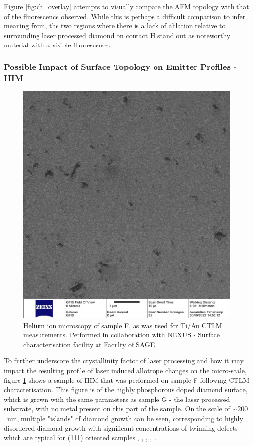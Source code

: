 \begin{refsection}
Figure \ref{fig:ch_overlay} attempts to visually compare the AFM topology with that of the fluorescence observed. While this is perhaps a difficult comparison to infer meaning from, the two regions where there is a lack of ablation relative to surrounding laser processed diamond on contact H stand out as noteworthy material with a visible fluorescence.

\subsubsection{Possible Impact of Surface Topology on Emitter Profiles - HIM}

\begin{figure}[H]
    \centering
    \includegraphics[width=\linewidth]{Chapter7/Figs/Raster/him 002 A.1.jpg}
    \caption{Helium ion microscopy of sample F, as was used for Ti/Au CTLM measurements. Performed in collaboration with NEXUS - Surface characterisation facility at Faculty of SAGE.}
    \label{fig:him_1}
\end{figure}

To further underscore the crystallinity factor of laser processing and how it may impact the resulting profile of laser induced allotrope changes on the micro-scale, figure \ref{fig:him_1} shows a sample of HIM that was performed on sample F following CTLM characterisation. This figure is of the highly phosphorous doped diamond surface, which is grown with the same parameters as sample G - the laser processed substrate, with no metal present on this part of the sample. On the scale of $\sim200$~\si{\nano\metre}, multiple "islands" of diamond growth can be seen, corresponding to highly disordered diamond growth with significant concentrations of twinning defects which are typical for \hkl(111) oriented samples \cite{Butler2007}, \cite{prelas:1997}, \cite{koizumi1997}, \cite{koizumi2000}, \cite{Shechtman1993}. 


\end{refsection}
